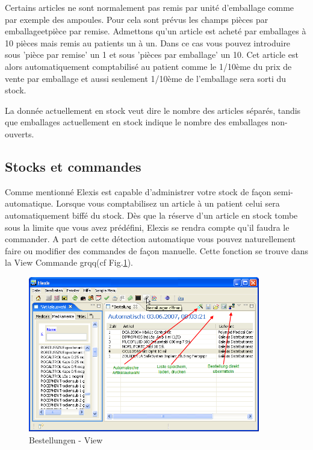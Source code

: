 Certains articles ne sont normalement pas remis par unité d'emballage comme par exemple des ampoules.
Pour cela sont prévus les champs \glqq pièces par emballage\grqq{}et\glqq pièce par remise\grqq{}. Admettons qu'un article est acheté par emballages à 10 pièces mais remis au patients un à un. Dans ce cas vous pouvez introduire sous 'pièce par remise' un 1 et sous 'pièces par emballage' un 10.
Cet article est alors automatiquement comptabilisé au patient comme le 1/10ème du prix de vente par emballage et aussi seulement 1/10ème de l'emballage sera sorti du stock.


La donnée \glqq actuellement en stock\grqq{} veut dire le nombre des articles séparés, tandis que \glqq emballages actuellement en stock\grqq{} indique le nombre des emballages non-ouverts.


\subsection{Stocks et commandes}
Comme mentionné Elexis est capable d'administrer votre stock de façon semi-automatique. Lorsque vous comptabilisez un article à un patient celui sera automatiquement biffé du stock. Dès que la réserve d'un article en stock tombe sous la limite que vous avez prédéfini, Elexis \glqq se rendra compte \grqq{} qu'il faudra le commander. A part de cette détection automatique vous pouvez naturellement faire ou modifier des commandes de façon manuelle.
Cette fonction se trouve dans la View \glqq Commande grqq{}(cf Fig.\ref{fig:bestellungen}).
\begin{figure}[htp]
\begin{center}
  \includegraphics[width=0.9\textwidth]{images/bestell1}
  \caption{Bestellungen - View}
  \label{fig:bestellungen}
\end{center}
\end{figure}


